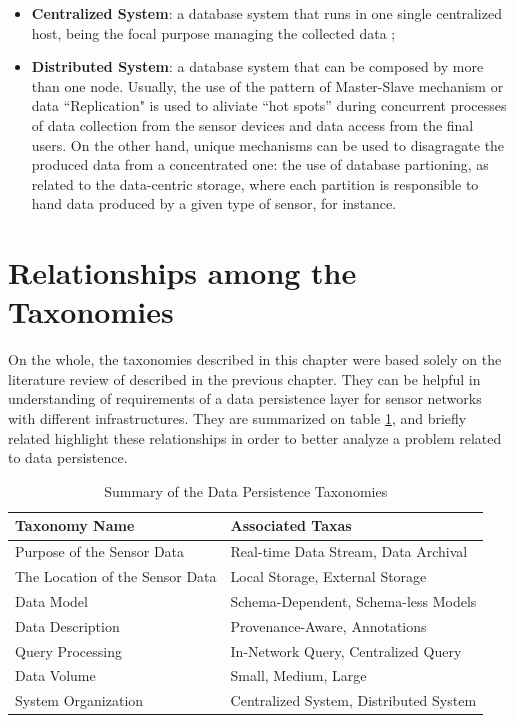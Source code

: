 \begin{itemize}
  \item \textbf{Centralized System}: a database system that runs in one single
  centralized host, being the focal purpose managing the collected data
  \cite{sn-intro01};
  \item \textbf{Distributed System}: a database system that can be composed by
  more than one node. Usually, the use of the pattern of Master-Slave
  mechanism or data ``Replication" is used to aliviate ``hot spots'' during
  concurrent processes of data collection from the sensor devices and data
  access from the final users. On the other hand, unique mechanisms can be
  used to disagragate the produced data from a concentrated one: the use 
  of database partioning, as related to the data-centric storage, where  
  each partition is responsible to hand data produced by a given type of 
  sensor, for instance.
\end{itemize}

\section{Relationships among the Taxonomies}

On the whole, the taxonomies described in this chapter were based solely on the
literature review of described in the previous chapter. They can be helpful in 
understanding of requirements of a data persistence layer for sensor networks
with different infrastructures. They are summarized on table
\ref{tab:taxonomies-list-summary}, and briefly related highlight these
relationships in order to better analyze a problem related to data persistence.

\begin{table}[!b]
    \label{tab:taxonomies-list-summary}
    \begin{center}
        \begin{tabular}{|p{170pt}|p{250pt}|}\hline 
        \textbf{Taxonomy Name} & \textbf{Associated Taxas}\\\hline 
        Purpose of the Sensor Data & Real-time Data Stream, Data Archival \\\hline 
        The Location of the Sensor Data & Local Storage, External Storage\\\hline
        Data Model & Schema-Dependent, Schema-less Models\\\hline 
        Data Description & Provenance-Aware, Annotations\\\hline
        Query Processing & In-Network Query, Centralized Query\\\hline 
        Data Volume & Small, Medium, Large\\\hline
        System Organization & Centralized System, Distributed System\\\hline
        \end{tabular}
    \end{center}
    \caption{Summary of the Data Persistence Taxonomies}
\end{table}


